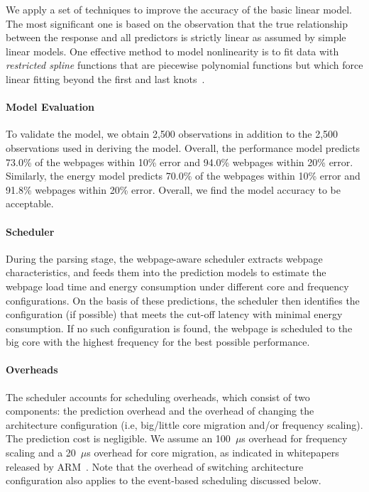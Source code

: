 We apply a set of techniques to improve the accuracy of the basic linear model. The most significant one is based on the observation that the true relationship between the response and all predictors is strictly linear as assumed by simple linear models.  One effective method to model nonlinearity is to fit data with \textit{restricted spline} functions that are piecewise polynomial functions but which force linear fitting beyond the first and last knots~\cite{ESL}.
 
\paragraph{Model Evaluation} To validate the model, we obtain 2,500 observations in addition to the 2,500 observations used in deriving the model. Overall, the performance model predicts 73.0\% of the webpages within 10\% error and 94.0\% webpages within 20\% error. Similarly, the energy model predicts 70.0\% of the webpages within 10\% error and 91.8\% webpages within 20\% error. Overall, we find the model accuracy to be acceptable.

\paragraph{Scheduler} During the parsing stage, the webpage-aware scheduler extracts webpage characteristics, and feeds them into the prediction models to estimate the webpage load time and energy consumption under different core and frequency configurations.  On the basis of these predictions, the scheduler then identifies the configuration (if possible) that meets the cut-off latency with minimal energy consumption. If no such configuration is found, the webpage is scheduled to the big core with the highest frequency for the best possible performance.

\paragraph{Overheads} The scheduler accounts for scheduling overheads, which consist of two components: the prediction overhead and the overhead of changing the architecture configuration (i.e, big/little core migration and/or frequency scaling). The prediction cost is negligible. We assume an 100~$\mu$s overhead for frequency scaling and a 20~$\mu$s overhead for core migration, as indicated in whitepapers released by ARM~\cite{arm-bl-sw-wp, arm-bl-wp}. Note that the overhead of switching architecture configuration also applies to the event-based scheduling discussed below.

